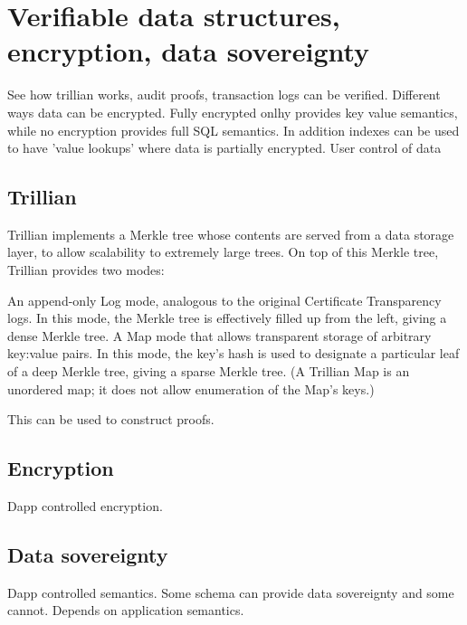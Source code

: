 \section{Verifiable data structures, encryption, data sovereignty}
See how trillian works, audit proofs, transaction logs can be verified. Different ways data can be encrypted.  Fully encrypted onlhy provides key value semantics, while no encryption provides full SQL semantics. In addition indexes can be used to have 'value lookups' where data is partially encrypted. User control of data
\subsection{Trillian}
Trillian implements a Merkle tree whose contents are served from a data storage layer, to allow scalability to extremely large trees. On top of this Merkle tree, Trillian provides two modes:

An append-only Log mode, analogous to the original Certificate Transparency logs. In this mode, the Merkle tree is effectively filled up from the left, giving a dense Merkle tree.
A Map mode that allows transparent storage of arbitrary key:value pairs. In this mode, the key's hash is used to designate a particular leaf of a deep Merkle tree, giving a sparse Merkle tree. (A Trillian Map is an unordered map; it does not allow enumeration of the Map's keys.)

This can be used to construct proofs.

\subsection{Encryption}
Dapp controlled encryption.

\subsection{Data sovereignty}
Dapp controlled semantics. Some schema can provide data sovereignty and some cannot. Depends on application semantics.
